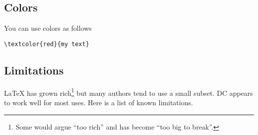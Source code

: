\subsection{Colors}

You can use colors as follows
\begin{lstlisting}
\textcolor{red}{my text}
\end{lstlisting}

\subsection{Limitations}
\label{sec:mtl::limitations}

LaTeX has grown rich\footnote{Some would argue ``too rich'' and has become ``too big to break''.} but many authors tend to use a small subset.  
%
DC appears to work well for most uses. 
%
Here is a list of known limitations.  
